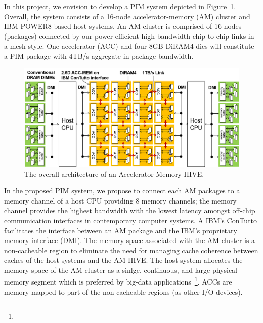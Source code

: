 \noindent 
In this project, we envision to develop a PIM system depicted in Figure~\ref{fig:arch}. 
Overall, the system consists of a 16-node accelerator-memory (AM) cluster and IBM POWER8-based host systems.
An AM cluster is comprised of 16 nodes (packages) connected by our power-efficient high-bandwidth chip-to-chip links in a mesh style. 
One accelerator (ACC) and four 8GB DiRAM4 dies will constitute a PIM package with 4TB/s aggregate in-package bandwidth. 

\begin{figure}
\center
\includegraphics[width=1.0\linewidth]{./fig/arch.png}
\caption{The overall architecture of an Accelerator-Memory HIVE.}
\label{fig:arch}
\end{figure}

In the proposed PIM system, we propose to connect each AM packages to a memory channel of a host CPU providing 8 memory channels;
the memory channel provides the highest bandwidth with the lowest latency amongst off-chip communication interfaces in contemporary computer systems.
A IBM's ConTutto facilitates the interface between an AM package and the IBM's proprietary memory interface (DMI).
The memory space associated with the AM cluster is a non-cacheable region to eliminate the need for managing cache coherence between caches of the host systems and the AM HIVE.
The host system allocates the memory space of the AM cluster as a sinlge, continuous, and large physical memory segment which is preferred by big-data applications~\footnote{}.
ACCs are memory-mapped to part of the non-cacheable regions (as other I/O devices).


